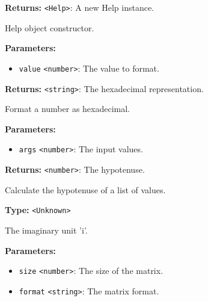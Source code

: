 \documentclass[12pt,a4paper]{article}
\begin{document}
\noindent \textbf{Returns:} \texttt{<Help>}: A new Help instance.

\noindent Help object constructor.

\vspace{5mm}
\noindent {}


\noindent \textbf{Parameters:}
\begin{itemize}
  \item \texttt{value} \texttt{<number>}: The value to format.
\end{itemize}

\noindent \textbf{Returns:} \texttt{<string>}: The hexadecimal representation.

\noindent Format a number as hexadecimal.

\vspace{5mm}
\noindent {}


\noindent \textbf{Parameters:}
\begin{itemize}
  \item \texttt{args} \texttt{<number>}: The input values.
\end{itemize}

\noindent \textbf{Returns:} \texttt{<number>}: The hypotenuse.

\noindent Calculate the hypotenuse of a list of values.

\vspace{5mm}
\noindent {}\vspace{4mm}


\noindent \textbf{Type:} \texttt{<Unknown>}

\noindent The imaginary unit 'i'.

\vspace{5mm}
\noindent {}


\noindent \textbf{Parameters:}
\begin{itemize}
  \item \texttt{size} \texttt{<number>}: The size of the matrix.
  \item \texttt{format} \texttt{<string>}: The matrix format.
\end{itemize}
\end{document}
